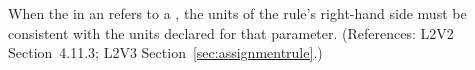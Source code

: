When the  in an \AssignmentRule refers to a \Parameter, the
units of the rule's right-hand side must be consistent with the units
declared for that parameter.  (References: L2V2 Section~4.11.3;
L2V3 Section~\ref{sec:assignmentrule}.)
